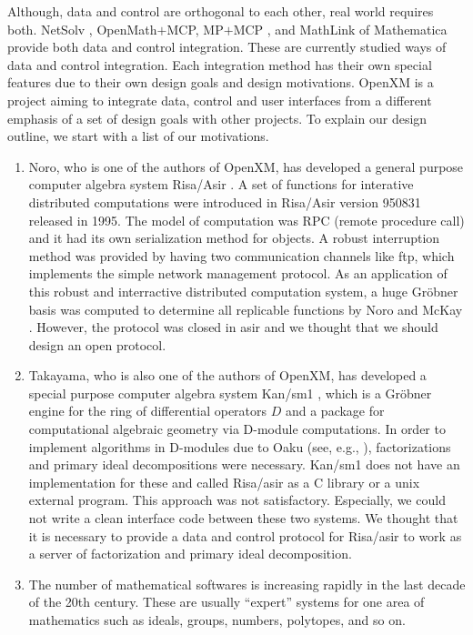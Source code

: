 Although, data and control are orthogonal to each other,
real world requires both.
NetSolv \cite{netsolve}, OpenMath$+$MCP, MP$+$MCP \cite{iamc},
and MathLink of Mathematica provide both data and control integration.
These are currently studied ways of data and control integration.
Each integration method has their own special features due to their
own design goals and design motivations.
OpenXM is a project aiming to integrate data, control and user interfaces
from a different emphasis of a set of design goals with other projects.
To explain our design outline, we start with a list of
our motivations.
\begin{enumerate}
\item Noro,  who is one of the authors of OpenXM, has developed a general
purpose computer algebra system Risa/Asir \cite{asir}.
A set of functions for interative distributed computations were introduced
in Risa/Asir version 950831 released in 1995.
The model of computation was RPC (remote procedure call)
and it had its own serialization method for objects.
A robust interruption method was provided by having two communication channels
like ftp, which implements the simple network management protocol.
As an application of this robust and interractive distributed computation
system, 
a huge Gr\"obner basis was computed
to determine all replicable functions by Noro and McKay \cite{noro-mckay}.
However, the protocol was closed in asir and we thought that we should
design an open protocol.
\item Takayama, who is also one of the authors of OpenXM, has developed
a special purpose computer algebra system Kan/sm1 \cite{kan},
which is a Gr\"obner engine for the ring of differential operators $D$ and
a package for computational algebraic geometry via D-module computations.
In order to implement algorithms in D-modules due to Oaku 
(see, e.g., \cite{sst-book}),
factorizations and primary ideal decompositions were necessary.
Kan/sm1 does not have an implementation for these and called
Risa/asir as a C library or a unix external program.
This approach was not satisfactory.
Especially, we could not write a clean interface code between these
two systems.
We thought that it is necessary to provide a data and control protocol
for Risa/asir to work as a server of factorization and primary ideal
decomposition.
\item The number of mathematical softwares is increasing rapidly in the last
decade of the 20th century.
These are usually ``expert'' systems for one area of mathematics
such as ideals, groups, numbers, polytopes, and so on.

\end{enumerate}
